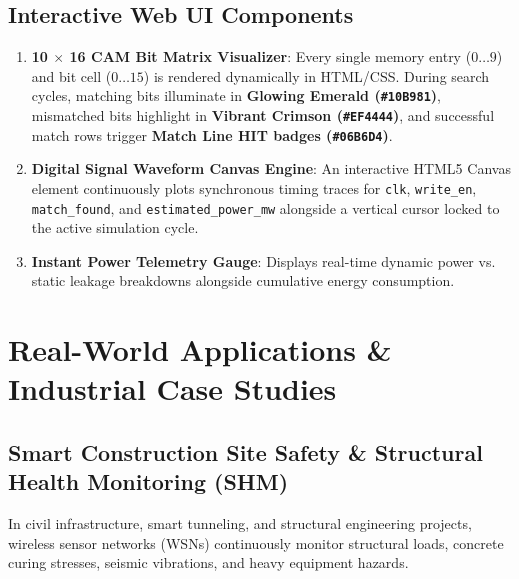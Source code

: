 \documentclass[11pt,a4paper,oneside]{report}
\begin{document}
\section{Interactive Web UI Components}
\begin{enumerate}[leftmargin=*]
    \item \textbf{10 $\times$ 16 CAM Bit Matrix Visualizer}: Every single memory entry ($0 \dots 9$) and bit cell ($0 \dots 15$) is rendered dynamically in HTML/CSS. During search cycles, matching bits illuminate in \textbf{Glowing Emerald (\texttt{\#10B981})}, mismatched bits highlight in \textbf{Vibrant Crimson (\texttt{\#EF4444})}, and successful match rows trigger \textbf{Match Line HIT badges (\texttt{\#06B6D4})}.
    \item \textbf{Digital Signal Waveform Canvas Engine}: An interactive HTML5 Canvas element continuously plots synchronous timing traces for \texttt{clk}, \texttt{write\_en}, \texttt{match\_found}, and \texttt{estimated\_power\_mw} alongside a vertical cursor locked to the active simulation cycle.
    \item \textbf{Instant Power Telemetry Gauge}: Displays real-time dynamic power vs. static leakage breakdowns alongside cumulative energy consumption.
\end{enumerate}

\chapter[Industrial Applications]{Real-World Applications \& Industrial Case Studies}

\section{Smart Construction Site Safety \& Structural Health Monitoring (SHM)}
In civil infrastructure, smart tunneling, and structural engineering projects, wireless sensor networks (WSNs) continuously monitor structural loads, concrete curing stresses, seismic vibrations, and heavy equipment hazards.
\end{document}
